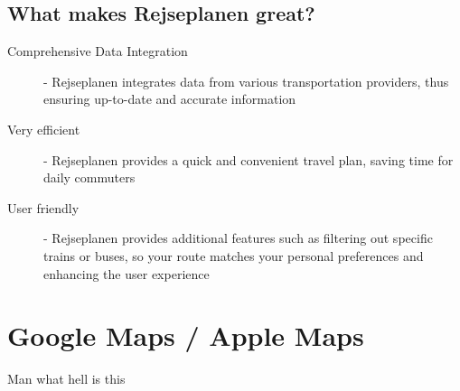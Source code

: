 \documentclass[11pt]{article}
\begin{document}
    \subsection{What makes Rejseplanen great?}\label{subsec:what-makes-rejseplanen-great?}
    \begin{description}
        \item [Comprehensive Data Integration] - Rejseplanen integrates data from various transportation providers, thus ensuring up-to-date and accurate information
        \item [Very efficient] - Rejseplanen provides a quick and convenient travel plan, saving time for daily commuters
        \item [User friendly] - Rejseplanen provides additional features such as filtering out specific trains or buses, so your route matches your personal preferences and enhancing the user experience
    \end{description}


    \section{Google Maps / Apple Maps}\label{sec:google-maps-/-apple-maps}
    Man what hell is this
\end{document}
